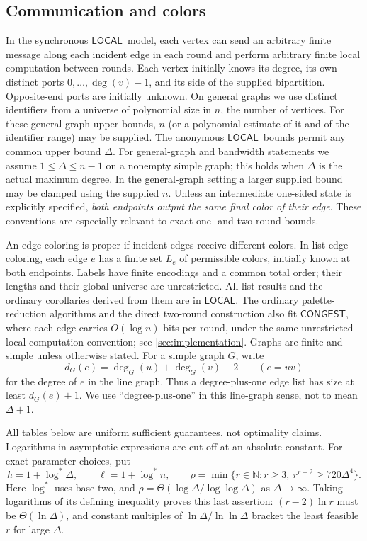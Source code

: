\documentclass[11pt]{article}
\theoremstyle{definition}
\theoremstyle{remark}
\newcommand{\N}{\mathbb N}
\newcommand{\logstar}{\log^*}
\newcommand{\LOCAL}{\ensuremath{\mathsf{LOCAL}}}
\newcommand{\CONGEST}{\ensuremath{\mathsf{CONGEST}}}
\begin{document}
\subsection{Communication and colors}
In the synchronous \LOCAL\ model, each vertex can send an arbitrary finite
message along each incident edge in each round and perform arbitrary finite
local computation between rounds. Each vertex initially knows its degree,
its own distinct ports $0,\ldots,\deg(v)-1$, and its side of the supplied
bipartition. Opposite-end ports are initially unknown. On general graphs
we use distinct identifiers from a universe of polynomial size in $n$,
the number of vertices. For these general-graph upper bounds, $n$ (or a polynomial estimate of it and of the identifier range) may be supplied. The anonymous \LOCAL\ bounds permit any common upper bound $\Delta$. For general-graph and bandwidth statements we assume $1\le\Delta\le n-1$ on a nonempty simple graph; this holds when $\Delta$ is the actual maximum degree. In the general-graph setting a larger supplied bound may be clamped using the supplied $n$. Unless an intermediate one-sided state is explicitly
specified, \emph{both endpoints output the same final color of their edge}.
These conventions are especially relevant to exact one- and two-round bounds.

An edge coloring is proper if incident edges receive different colors.
In list edge coloring, each edge $e$ has a finite set $L_e$ of permissible
colors, initially known at both endpoints. Labels have finite encodings
and a common total order; their lengths and their global universe are
unrestricted. All list results and the ordinary corollaries derived from them are in \LOCAL. The ordinary palette-reduction algorithms and the direct two-round construction also fit
\CONGEST, where each edge carries $O(\log n)$ bits per round, under the
same unrestricted-local-computation convention; see
\cref{sec:implementation}. Graphs are finite and simple unless otherwise
stated. For a simple graph $G$, write
\[
 d_G(e)=\deg_G(u)+\deg_G(v)-2\qquad(e=uv)
\]
for the degree of $e$ in the line graph. Thus a degree-plus-one edge list
has size at least $d_G(e)+1$. We use ``degree-plus-one'' in this line-graph
sense, not to mean $\Delta+1$.

All tables below are uniform sufficient guarantees, not optimality claims.
Logarithms in asymptotic expressions are cut off at an absolute constant.
For exact parameter choices, put
\begin{equation}\label{eq:rho}
 h=1+\logstar\Delta,\qquad \ell=1+\logstar n,\qquad
 \rho=\min\{r\in\N:r\ge3,\ r^{r-2}\ge720\Delta^4\}.
\end{equation}
Here $\logstar$ uses base two, and
$\rho=\Theta(\log\Delta/\log\log\Delta)$ as $\Delta\to\infty$.
Taking logarithms of its defining inequality proves this last assertion:
$(r-2)\ln r$ must be $\Theta(\ln\Delta)$, and constant multiples of
$\ln\Delta/\ln\ln\Delta$ bracket the least feasible $r$ for large $\Delta$.
\end{document}
